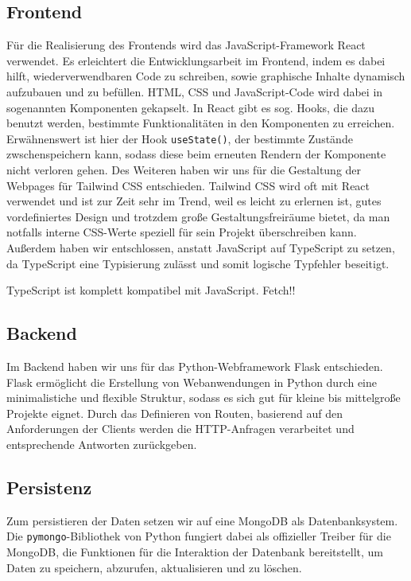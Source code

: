 \documentclass[conference,a4paper,flushend]{cs-techrep}
\begin{document}
\subsection{Frontend}
Für die Realisierung des Frontends wird das JavaScript-Framework React verwendet. Es erleichtert die Entwicklungsarbeit im Frontend, indem es dabei hilft, wiederverwendbaren Code zu schreiben, sowie graphische Inhalte dynamisch aufzubauen und zu befüllen. HTML, CSS und JavaScript-Code wird dabei in sogenannten Komponenten gekapselt. In React gibt es sog. Hooks, die dazu benutzt werden, bestimmte Funktionalitäten in den Komponenten zu erreichen. Erwähnenswert ist hier der Hook \texttt{useState()}, der bestimmte Zustände zwschenspeichern kann, sodass diese beim erneuten Rendern der Komponente nicht verloren gehen. Des Weiteren haben wir uns für die Gestaltung der Webpages für Tailwind CSS entschieden. Tailwind CSS wird oft mit React verwendet und ist zur Zeit sehr im Trend, weil es leicht zu erlernen ist, gutes vordefiniertes Design und trotzdem große Gestaltungsfreiräume bietet, da man notfalls interne CSS-Werte speziell für sein Projekt überschreiben kann. Außerdem haben wir entschlossen, anstatt JavaScript auf TypeScript zu setzen, da TypeScript eine Typisierung zulässt und somit logische Typfehler beseitigt. 

TypeScript ist komplett kompatibel mit JavaScript.
Fetch!!


\subsection{Backend}
Im Backend haben wir uns für das Python-Webframework Flask entschieden. Flask ermöglicht die Erstellung von Webanwendungen in Python durch eine minimalistiche und flexible Struktur, sodass es sich gut für kleine bis mittelgroße Projekte eignet. Durch das Definieren von Routen, basierend auf den Anforderungen der Clients werden die HTTP-Anfragen verarbeitet und entsprechende Antworten zurückgeben. 

\subsection{Persistenz}
Zum persistieren der Daten setzen wir auf eine MongoDB als Datenbanksystem. Die \texttt{pymongo}-Bibliothek von Python fungiert dabei als offizieller Treiber für die MongoDB, die Funktionen für die Interaktion der Datenbank bereitstellt, um Daten zu speichern, abzurufen, aktualisieren und zu löschen.
\end{document}
